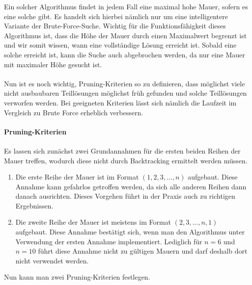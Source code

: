 \documentclass[a4paper, notitlepage, 12pt]{scrartcl}
\begin{document}
Ein solcher Algorithmus findet in jedem Fall eine maximal hohe Mauer, sofern es eine solche gibt. Es handelt sich hierbei nämlich nur um eine intelligentere Variante der Brute-Force-Suche. Wichtig für die Funktionsfähigkeit dieses Algorithmus ist, dass die Höhe der Mauer durch einen Maximalwert begrenzt ist und wir somit wissen, wann eine vollständige Lösung erreicht ist. Sobald eine solche erreicht ist, kann die Suche auch abgebrochen werden, da nur eine Mauer mit maximaler Höhe gesucht ist.
\\ \\
Nun ist es noch wichtig, Pruning-Kriterien so zu definieren, dass möglichst viele nicht ausbaubaren Teillösungen möglichst früh gefunden und solche Teillösungen verworfen werden. Bei geeigneten Kriterien lässt sich nämlich die Laufzeit im Vergleich zu Brute Force erheblich verbessern.
\\ \\
\textbf{Pruning-Kriterien}
\\ \\
Es lassen sich zunächst zwei Grundannahmen für die ersten beiden Reihen der Mauer treffen, wodurch diese nicht durch Backtracking ermittelt werden müssen.
\begin{enumerate}
\item Die erste Reihe der Mauer ist im Format $(1,2,3,...,n)$ aufgebaut. Diese Annahme kann gefahrlos getroffen werden, da sich alle anderen Reihen dann danach ausrichten. Dieses Vorgehen führt in der Praxis auch zu richtigen Ergebnissen.
\item Die zweite Reihe der Mauer ist meistens im Format $(2,3,...,n,1)$ aufgebaut. Diese Annahme bestätigt sich, wenn man den Algorithmus unter Verwendung der ersten Annahme implementiert. Lediglich für $n = 6$ und $n = 10$ führt diese Annahme nicht zu gültigen Mauern und darf deshalb dort nicht verwendet werden.
\end{enumerate}
Nun kann man zwei Pruning-Kriterien festlegen.
\end{document}
